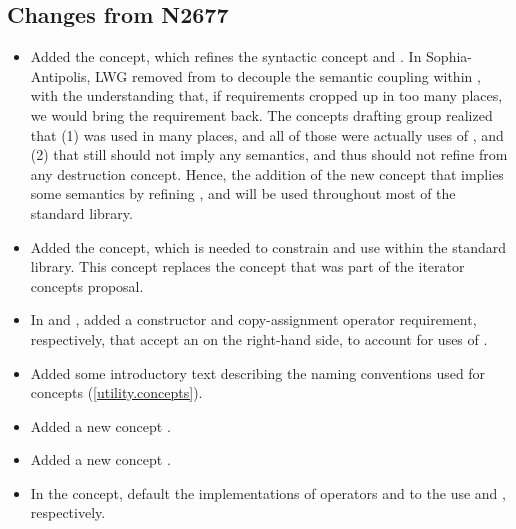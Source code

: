 \documentclass[american,twoside]{book}
\begin{document}
\begin{titlepage}

\section*{Changes from N2677}
\begin{itemize}
\item Added the  concept, which refines the
  syntactic  concept and
  . In Sophia-Antipolis, LWG removed
   from  to decouple the
  semantic coupling within , with the
  understanding that, if  requirements cropped up
  in too many places, we would bring the 
  requirement back. The concepts drafting group realized that (1)
   was used in many places, and all of those were
  actually uses of , and (2) that
   still should not imply any semantics, and
  thus should not refine from any destruction concept. Hence, the
  addition of the new  concept that implies some
  semantics by refining , and will be used
  throughout most of the standard library.

\item Added the  concept, which is needed to constrain
  and use  within the standard library. This concept
  replaces the  concept that was part of the
  iterator concepts proposal.

\item In  and , added a
  constructor and copy-assignment operator requirement, respectively,
  that accept an  on the right-hand side, to
  account for uses of .

\item Added some introductory text describing the naming conventions
  used for concepts (\ref{utility.concepts}).

\item Added a new concept .

\item Added a new concept .

\item In the  concept, default the
  implementations of operators  and  to
  the use  and , respectively.


\end{itemize}
\end{titlepage}
\end{document}

